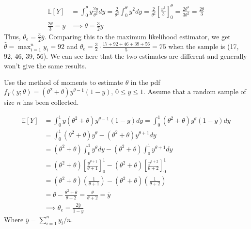 \documentclass{article}
\newcommand{\E}{\mathbb{E}}
\begin{document}
\begin{probset}
\begin{prob}
\begin{subprobset}
\begin{subprob}
            \begin{soln}
                \begin{align*}
                    \E[Y] &= \int_0^\theta y \frac{2y}{\theta^2} dy = \frac{2}{\theta^2} \int_0^\theta y^2 dy = \frac{2}{\theta^2} \left[ \frac{y^3}{3} \right]_0^\theta = \frac{2\theta^3}{3\theta^2} = \frac{2\theta}{3} \\
                    \frac{2\theta}{3} = \bar{y} &\implies \theta = \frac{3}{2} \bar{y}
                \end{align*}
                Thus, $\theta_{e} = \frac{3}{2} \bar{y}$. Comparing this to the maximum likelihood estimator, we get $\hat\theta = \max_{i=1}^n y_i = 92$ and $\theta_{e} = \frac{3}{2} \cdot \frac{17 + 92 + 46 + 39 + 56}{5} = 75$ when the sample is (17, 92, 46, 39, 56). We can see here that the two estimates are different and generally won't give the same results.
            \end{soln}
        \end{subprob}
    \end{subprobset}
\end{prob}

\newpage

\begin{prob}[\textbf{5.2.18}]
    Use the method of moments to estimate $\theta$ in the pdf $f_Y(y; \theta) = (\theta^2 + \theta)y^{\theta-1}(1 - y)$, $0 \leq y \leq 1$. Assume that a random sample of size $n$ has been collected.

    \begin{soln}
        \begin{align*}
            \E[Y] &= \int_0^1 y (\theta^2 + \theta)y^{\theta-1}(1 - y) dy = \int_0^1 (\theta^2 + \theta)y^{\theta}(1 - y) dy \\
            &= \int_0^1 (\theta^2 + \theta)y^{\theta} - (\theta^2 + \theta)y^{\theta+1} dy \\
            &= (\theta^2 + \theta) \int_0^1 y^{\theta} dy - (\theta^2 + \theta) \int_0^1 y^{\theta+1} dy \\
            &= (\theta^2 + \theta) \left[ \frac{y^{\theta+1}}{\theta+1} \right]_0^1 - (\theta^2 + \theta) \left[ \frac{y^{\theta+2}}{\theta+2} \right]_0^1 \\
            &= (\theta^2 + \theta) \left( \frac{1}{\theta+1} \right) - (\theta^2 + \theta) \left( \frac{1}{\theta+2} \right) \\
            &= \theta - \frac{\theta^2 + \theta}{\theta+2} = \frac{\theta}{\theta + 2} = \bar{y} \\
            &\implies \theta_e = \frac{2\bar{y}}{1 - \bar{y}}
        \end{align*}
        Where $\bar{y} = \sum_{i=1}^n y_i / n$.
    \end{soln}
\end{prob}


\end{probset}
\end{document}
